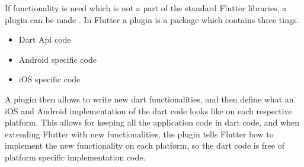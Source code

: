 If functionality is need which is not a part of the standard Flutter libraries, a plugin can be made \cite{docker_plugins}. In Flutter a plugin is a package which contains three tings.

\begin{itemize}
    \item  Dart Api code
    \item  Android specific code
    \item  iOS specific code
\end{itemize}

A plugin then allows to write new dart functionalities, and then define what an iOS and Android implementation of the dart code looks like on each respective platform. This allows for keeping all the application code in dart code, and when extending Flutter  with new functionalities, the plugin tells Flutter how to implement the new functionality on each platform, so the dart code is free of platform specific implementation code.
